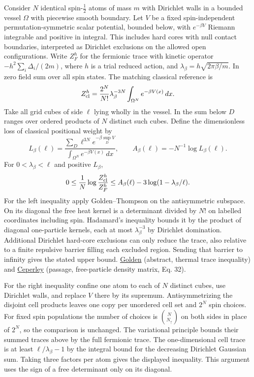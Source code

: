 \documentclass[11pt,a4paper]{article}
\begin{document}
Consider \(N\) identical spin-\(\tfrac12\) atoms of mass \(m\) with
Dirichlet walls in a bounded vessel \(\Omega\) with piecewise smooth
boundary. Let \(V\) be a fixed spin-independent permutation-symmetric
scalar potential, bounded below, with \(e^{-\beta V}\) Riemann
integrable and positive in integral. This includes hard cores with null
contact boundaries, interpreted as Dirichlet exclusions on the allowed
open configurations. Write \(Z_F^h\) for the fermionic trace with
kinetic operator \(-h^2\sum_i\Delta_i/(2m)\), where \(h\) is a trial
reduced action, and \(\lambda_\beta=h\sqrt{2\pi\beta/m}\). In zero field
sum over all spin states. The matching classical reference is \[
 Z_{\rm cl}^h=\frac{2^N}{N!}\lambda_\beta^{-3N}
          \int_{\Omega^N}e^{-\beta V(x)}\,dx .
\] Take all grid cubes of side \(\ell\) lying wholly in the vessel. In
the sum below \(D\) ranges over ordered products of \(N\) distinct such
cubes. Define the dimensionless loss of classical positional weight by
\[
 L_\beta(\ell)=
 \frac{\sum_D \ell^{3N}e^{-\beta\sup_D V}}
      {\int_{\Omega^N}e^{-\beta V(x)}\,dx},\qquad
 A_\beta(\ell)=-N^{-1}\log L_\beta(\ell).
\] For \(0<\lambda_\beta<\ell\) and positive \(L_\beta\), \[
 0\le\frac1N\log\frac{Z_{\rm cl}^h}{Z_F^h}
   \le A_\beta(\ell)-3\log(1-\lambda_\beta/\ell).
\] For the left inequality apply Golden--Thompson on the antisymmetric
subspace. On its diagonal the free heat kernel is a determinant divided
by \(N!\) on labelled coordinates including spin. Hadamard's inequality
bounds it by the product of diagonal one-particle kernels, each at most
\(\lambda_\beta^{-3}\) by Dirichlet domination. Additional Dirichlet
hard-core exclusions can only reduce the trace, also relative to a
finite repulsive barrier filling each excluded region. Sending that
barrier to infinity gives the stated upper bound.
\href{https://doi.org/10.1103/PhysRev.137.B1127}{Golden} (abstract,
thermal trace inequality) and
\href{https://people.physics.illinois.edu/Ceperley/papers/059a.pdf}{Ceperley}
(passage, free-particle density matrix, Eq. 32).

For the right inequality confine one atom to each of \(N\) distinct
cubes, use Dirichlet walls, and replace \(V\) there by its supremum.
Antisymmetrizing the disjoint cell products leaves one copy per
unordered cell set and \(2^N\) spin choices. For fixed spin populations
the number of choices is \(\binom{N}{N_\uparrow}\) on both sides in
place of \(2^N\), so the comparison is unchanged. The variational
principle bounds their summed traces above by the full fermionic trace.
The one-dimensional cell trace is at least \(\ell/\lambda_\beta-1\) by
the integral bound for the decreasing Dirichlet Gaussian sum. Taking
three factors per atom gives the displayed inequality. This argument
uses the sign of a free determinant only on its diagonal.
\end{document}
